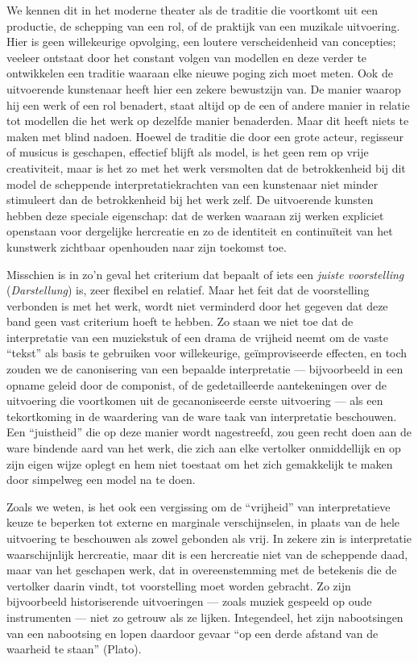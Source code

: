We kennen dit in het moderne theater als de traditie die voortkomt uit een productie, de schepping van een rol, of de praktijk van een muzikale uitvoering. Hier is geen willekeurige opvolging, een loutere verscheidenheid van concepties; veeleer ontstaat door het constant volgen van modellen en deze verder te ontwikkelen een traditie waaraan elke nieuwe poging zich moet meten. Ook de uitvoerende kunstenaar heeft hier een zekere bewustzijn van. De manier waarop hij een werk of een rol benadert, staat altijd op de een of andere manier in relatie tot modellen die het werk op dezelfde manier benaderden. Maar dit heeft niets te maken met blind nadoen. Hoewel de traditie die door een grote acteur, regisseur of musicus is geschapen, effectief blijft als model, is het geen rem op vrije creativiteit, maar is het zo met het werk versmolten dat de betrokkenheid bij dit model de scheppende interpretatiekrachten van een kunstenaar niet minder stimuleert dan de betrokkenheid bij het werk zelf. De uitvoerende kunsten hebben deze speciale eigenschap: dat de werken waaraan zij werken expliciet openstaan voor dergelijke hercreatie en zo de identiteit en continuïteit van het kunstwerk zichtbaar openhouden naar zijn toekomst toe.

Misschien is in zo’n geval het criterium dat bepaalt of iets een \textit{juiste voorstelling} (\textit{Darstellung}) is, zeer flexibel en relatief. Maar het feit dat de voorstelling verbonden is met het werk, wordt niet verminderd door het gegeven dat deze band geen vast criterium hoeft te hebben. Zo staan we niet toe dat de interpretatie van een muziekstuk of een drama de vrijheid neemt om de vaste ``tekst'' als basis te gebruiken voor willekeurige, geïmproviseerde effecten, en toch zouden we de canonisering van een bepaalde interpretatie — bijvoorbeeld in een opname geleid door de componist, of de gedetailleerde aantekeningen over de uitvoering die voortkomen uit de gecanoniseerde eerste uitvoering — als een tekortkoming in de waardering van de ware taak van interpretatie beschouwen. Een ``juistheid'' die op deze manier wordt nagestreefd, zou geen recht doen aan de ware bindende aard van het werk, die zich aan elke vertolker onmiddellijk en op zijn eigen wijze oplegt en hem niet toestaat om het zich gemakkelijk te maken door simpelweg een model na te doen.

Zoals we weten, is het ook een vergissing om de ``vrijheid'' van interpretatieve keuze te beperken tot externe en marginale verschijnselen, in plaats van de hele uitvoering te beschouwen als zowel gebonden als vrij. In zekere zin is interpretatie waarschijnlijk hercreatie, maar dit is een hercreatie niet van de scheppende daad, maar van het geschapen werk, dat in overeenstemming met de betekenis die de vertolker daarin vindt, tot voorstelling moet worden gebracht. Zo zijn bijvoorbeeld historiserende uitvoeringen — zoals muziek gespeeld op oude instrumenten — niet zo getrouw als ze lijken. Integendeel, het zijn nabootsingen van een nabootsing en lopen daardoor gevaar ``op een derde afstand van de waarheid te staan'' (Plato).

